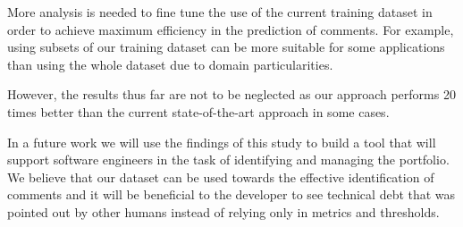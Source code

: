 More analysis is needed to fine tune the use of the current training dataset in order to achieve maximum efficiency in the prediction of \SATD comments. For example, using subsets of our training dataset can be more suitable for some applications than using the whole dataset due to domain particularities. 

However, the results thus far are not to be neglected as our approach performs 20 times better than the current state-of-the-art approach in some cases.

In a future work we will use the findings of this study to build a tool that will support software engineers in the task of identifying and managing the \SATD portfolio. We believe that our dataset can be used towards the effective identification of \SATD comments and it will be beneficial to the developer to see technical debt that was pointed out by other humans instead of relying only in metrics and thresholds. 